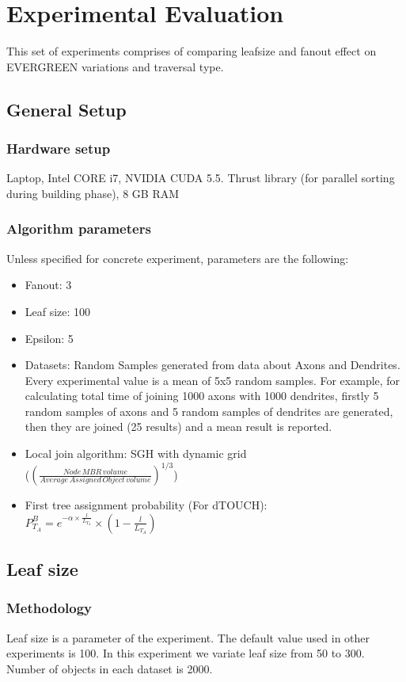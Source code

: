 \documentclass{sig-alternate}
\newcommand{\newSJ}{EVERGREEN}
\begin{document}
\section{Experimental Evaluation}
\label{s_experimental_evaluation}

This set of experiments comprises of comparing leafsize and fanout effect on {\newSJ} variations and traversal type.

\subsection{General Setup}
\subsubsection{Hardware setup}
Laptop, Intel CORE i7, NVIDIA CUDA 5.5. Thrust library (for parallel sorting during building phase), 8 GB RAM 
\subsubsection{Algorithm parameters}
Unless specified for concrete experiment, parameters are the following:
\begin{itemize}
\item Fanout: 3
\item Leaf size: 100
\item Epsilon: 5
\item Datasets: Random Samples generated from data about Axons and Dendrites. Every experimental value is a mean of 5x5 random samples. For example, for calculating total time of joining 1000 axons with 1000 dendrites, firstly 5 random samples of axons and 5 random samples of dendrites are generated, then they are joined (25 results) and a mean result is reported.
\item Local join algorithm: SGH with dynamic grid \\
($(\frac{Node\, MBR\,  volume}{Average\,  Assigned\, Object\,  volume})^{1/3}$)
\item First tree assignment probability (For dTOUCH):\\ ${P^{B}_{T_A}}=e^{-\alpha\times\frac{l}{L_{T_A}}}\times(1-\frac{l}{L_{T_A}})$
\end{itemize}

\subsection{Leaf size}
\subsubsection{Methodology}
Leaf size is a parameter of the experiment. The default value used in other experiments is 100. In this experiment we variate leaf size from 50 to 300. Number of objects in each dataset is 2000.
\end{document}
